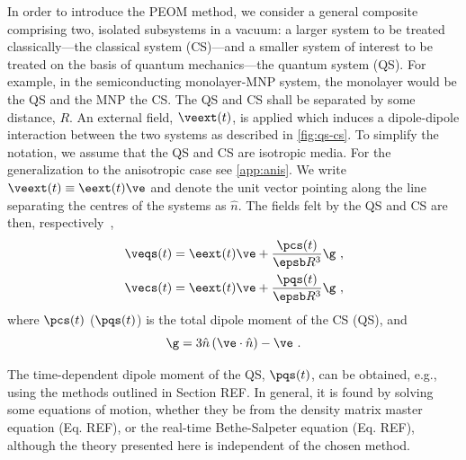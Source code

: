  In order to introduce the PEOM method, 
we consider a general composite comprising two, isolated subsystems in a vacuum:
a larger system to be treated
classically---the classical system (CS)---and a smaller system of interest to
be treated on the basis of quantum mechanics---the quantum system (QS). For
example, in the semiconducting monolayer-MNP system, the monolayer would be the
QS and the MNP the CS. The QS and CS shall be separated by some distance, $R$.
An external field, $\veext(t)$, is applied which induces a dipole-dipole
interaction between the two systems as described in \cref{fig:qs-cs}.
To simplify the
notation, we assume that the QS and CS are isotropic media. For the
generalization to the anisotropic case see \cref{app:anis}.
We write
$\veext(t)\equiv\eext(t)\ve$ and denote the unit vector pointing along the
line separating the centres of the systems as $\hat n$. The fields felt by
the QS and CS are then,
respectively~\cite{jackson_classical_1962,schmitt_preparation_1999,zhang_semiconductor-metal_2006},
%
\begin{subequations}
    \begin{align}
        \veqs(t) &= \eext(t)\ve + \frac{\pcs(t)}{\epsb R^3}\g \ , \label{eq:eqs}\\
        \vecs(t) &= \eext(t)\ve + \frac{\pqs(t)}{\epsb R^3}\g \ , \label{eq:ecs}
    \end{align}
    \label{eq:fields1}
\end{subequations}
%
where $\pcs(t)$ ($\pqs(t)$) is the total dipole moment of
the CS (QS), and
%
\begin{equation}
    \g=3\hat n\left( \ve \cdot \hat n \right) - \ve \ .
    \label{eq:g_def}
\end{equation}
%

The time-dependent dipole moment of the QS, $\pqs(t)$, can be
obtained, e.g., using the methods outlined in Section REF. In general, it is
found by solving some equations of motion, whether they be from the density matrix
master equation (Eq. REF), or the real-time Bethe-Salpeter equation (Eq. REF),
although the theory presented here is independent of the chosen method.

